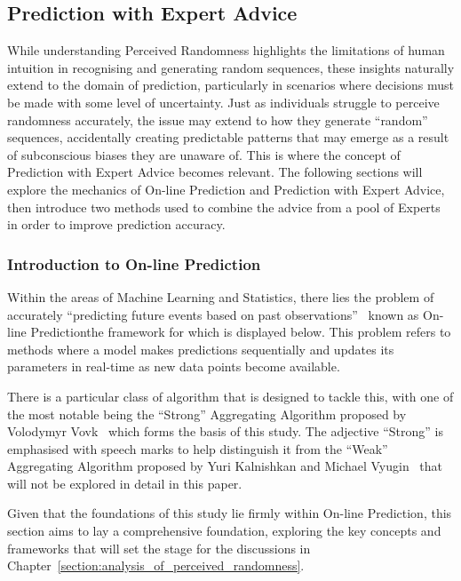 \subsection{Prediction with Expert Advice}\label{subsection:prediction_with_expert_advice}
While understanding Perceived Randomness highlights the limitations of human intuition in recognising and generating random sequences, these insights naturally extend to the domain of prediction, particularly in scenarios where decisions must be made with some level of uncertainty. Just as individuals struggle to perceive randomness accurately, the issue may extend to how they generate ``random'' sequences, accidentally creating predictable patterns that may emerge as a result of subconscious biases they are unaware of. This is where the concept of Prediction with Expert Advice becomes relevant. The following sections will explore the mechanics of On-line Prediction and Prediction with Expert Advice, then introduce two methods used to combine the advice from a pool of Experts in order to improve prediction accuracy.

\subsubsection{Introduction to On-line Prediction}\label{subsubsection:introduction_to_on-line_prediction}
Within the areas of Machine Learning and Statistics, there lies the problem of accurately ``predicting future events based on past observations''~\cite{cesa-bianchi:1997} known as On-line Prediction\textemdash{}the framework for which is displayed below. This problem refers to methods where a model makes predictions sequentially and updates its parameters in real-time as new data points become available.

There is a particular class of algorithm that is designed to tackle this, with one of the most notable being the ``Strong'' Aggregating Algorithm proposed by Volodymyr Vovk~\cite{vovk:1990} which forms the basis of this study. The adjective ``Strong'' is emphasised with speech marks to help distinguish it from the ``Weak'' Aggregating Algorithm proposed by Yuri Kalnishkan and Michael Vyugin~\cite{kalnishkan/vyugin:2008} that will not be explored in detail in this paper.

Given that the foundations of this study lie firmly within On-line Prediction, this section aims to lay a comprehensive foundation, exploring the key concepts and frameworks that will set the stage for the discussions in Chapter~\ref{section:analysis_of_perceived_randomness}.

